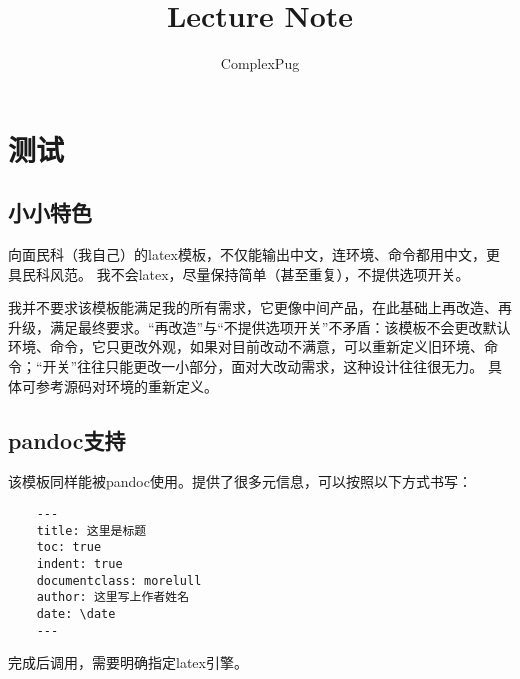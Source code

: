 \documentclass[12pt,A4paper,oneside]{ctexbook}
\begin{document}
	
\title{Lecture Note}
\author{ComplexPug}
\begin{titlepage}
    \maketitle
\end{titlepage}

\begin{titlepage}
	\tableofcontents
\end{titlepage}    

\chapter{测试}

\section{小小特色}

向面民科（我自己）的latex模板，不仅能输出中文，连环境、命令都用中文，更具民科风范。
我不会latex，尽量保持简单（甚至重复），不提供选项开关。

我并不要求该模板能满足我的所有需求，它更像中间产品，在此基础上再改造、再升级，满足最终要求。“再改造”与“不提供选项开关”不矛盾：该模板不会更改默认环境、命令，它只更改外观，如果对目前改动不满意，可以重新定义旧环境、命令；“开关”往往只能更改一小部分，面对大改动需求，这种设计往往很无力。
具体可参考源码对环境的重新定义。

\section{pandoc支持}

该模板同样能被pandoc使用。提供了很多元信息，可以按照以下方式书写：

\begin{lstlisting}
    ---
    title: 这里是标题
    toc: true
    indent: true
    documentclass: morelull
    author: 这里写上作者姓名
    date: \date
    ---
\end{lstlisting}

完成后调用，需要明确指定latex引擎。
\end{document}
